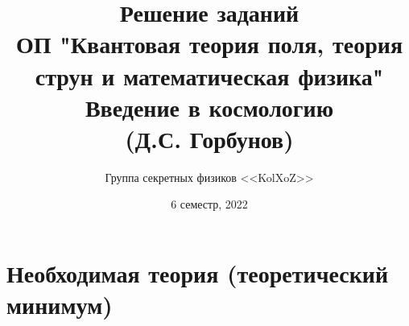 \documentclass[12pt]{article}
\title{Решение заданий\\ ОП "Квантовая теория поля, теория струн и математическая физика"\\[2cm]
Введение в космологию\\ (Д.С. Горбунов)}
\author{Группа секретных физиков <<KolXoZ>>}
\date{6 семестр, 2022}
\theoremstyle{definition}
\newtheorem{zad}{Задача}[section]
\begin{document}
\maketitle
\newpage
\tableofcontents{}
\newpage
\section{Необходимая теория (теоретический минимум)}
\end{document}
